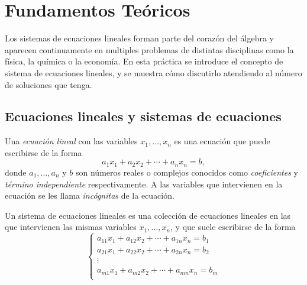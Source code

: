 \documentclass[a4paper]{article}
\begin{document}

\bigskip
\section*{Fundamentos Teóricos}

Los sistemas de ecuaciones lineales forman parte del corazón del álgebra y aparecen continuamente en multiples problemas de distintas disciplinas como la física, la química o la economía. En esta práctica se introduce el concepto de sistema de ecuaciones lineales, y se muestra cómo discutirlo atendiendo al número de soluciones que tenga.

\subsection*{Ecuaciones lineales y sistemas de ecuaciones}
Una \emph{ecuación lineal} con las variables $x_1,\ldots,x_n$ es una ecuación que puede escribirse de la forma
\[
a_1x_1+a_2x_2+\cdots+a_nx_n=b,
\]
donde $a_1,\ldots,a_n$ y $b$ son números reales o complejos conocidos como \emph{coeficientes} y \emph{término independiente} respectivamente. A las variables que intervienen en la ecuación se les llama \emph{incógnitas} de la ecuación.

Un sistema de ecuaciones lineales es una colección de ecuaciones lineales en las que intervienen las mismas variables $x_1,\ldots,x_n$, y que suele escribirse de la forma
\[\left\{
\begin{array}{c}
 a_{11}x_1+a_{12}x_2+\cdots+a_{1n}x_n=b_1 \\
 a_{21}x_1+a_{22}x_2+\cdots+a_{2n}x_n=b_2 \\
                  \vdots                  \\
 a_{m1}x_1+a_{m2}x_2+\cdots+a_{mn}x_n=b_m \\
\end{array}
\right.
\]
\end{document}

